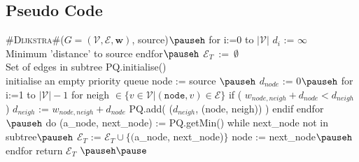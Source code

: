 \begin{slide}
\section[-2.4]{Pseudo Code}

\begin{pseudo}
#\textsc{Dijkstra}#($G=(\mathcal{V},\mathcal{E},\bm{w})$, source)$\pauseh$ {
   for i:=0 to $|\mathcal{V}|$
      $d_i$ := $\infty$               \\ Minimum 'distance' to source
   endfor$\pauseh$
   $\mathcal{E}_T\,$ := $\,\emptyset$                  \\ Set of edges in subtree
   PQ.initialise()       \\ initialise an empty priority queue
   node := source              $\pauseh$
   $d_{node}$ := 0$\pauseh$
   for i:=1 to $|\mathcal{V}|-1$
      for neigh $\in \{v\in\mathcal{V}| (\mathtt{node},v)\in\mathcal{E}\}$ 
         if ( $w_{node,neigh}+d_{node} < d_{neigh}\,\,$  )
            $d_{neigh}$ := $w_{node,neigh}+d_{node}$
            PQ.add( ($d_{neigh}$, (node, neigh)) )
         endif
      endfor$\pauseh$
      do
         (a_node, next_node) := PQ.getMin()
      while next_node not in subtree$\pauseh$
      $\mathcal{E}_T$ := $\mathcal{E}_T \cup \{($a_node, next_node)$\}$
      node := next_node$\pauseh$
   endfor
   return $\mathcal{E}_T$
}$\pauseh\pause$
\end{pseudo}
\vspace*{-1cm}

\end{slide}

